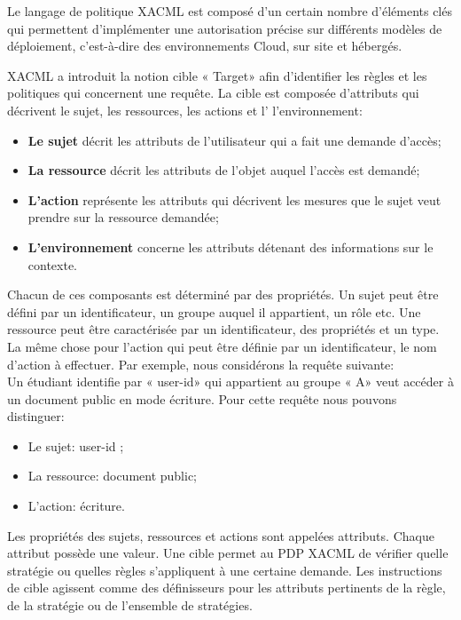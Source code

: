 Le langage de politique XACML est composé d'un certain nombre d'éléments clés qui permettent d'implémenter une autorisation précise sur différents modèles de déploiement, c'est-à-dire des environnements Cloud, sur site et hébergés.

\label{sectionCible}

XACML a introduit la notion cible « Target» afin d'identifier les règles et les politiques qui
concernent une requête. La cible est composée d'attributs qui décrivent le sujet, les
ressources, les actions et l' l'environnement:
\begin{itemize}
\item \textbf{Le sujet} décrit les attributs de l'utilisateur qui a fait une demande d'accès;
\item \textbf{La ressource} décrit les attributs de l'objet auquel l'accès est demandé;
\item \textbf{L'action} représente les attributs qui décrivent les mesures que le sujet veut
prendre sur la ressource demandée;
\item \textbf{L'environnement} concerne les attributs détenant des informations sur le
contexte.
\end{itemize}

\hspace*{0.5cm} Chacun de ces composants est déterminé par des propriétés. Un sujet peut être défini
par un identificateur, un groupe auquel il appartient, un rôle etc. Une ressource peut être caractérisée par un identificateur, des propriétés et un type. La même chose pour l'action qui peut être définie par un identificateur, le nom d'action à effectuer. Par exemple, nous considérons la requête suivante: \\
\hspace*{0.5cm} Un étudiant identifie par « user-id» qui appartient au groupe « A» veut accéder à un document public en mode écriture. Pour cette requête nous pouvons distinguer:

\begin{itemize}
\item Le sujet: user-id ;
\item La ressource: document public;
\item L'action: écriture.
\end{itemize}

\hspace*{0.5cm} Les propriétés des sujets, ressources et actions sont appelées attributs. Chaque attribut
possède une valeur. Une cible permet au PDP XACML de vérifier quelle stratégie ou quelles règles s'appliquent à une certaine demande. Les instructions de cible agissent comme des définisseurs pour les attributs pertinents de la règle, de la stratégie ou de l'ensemble de stratégies.

